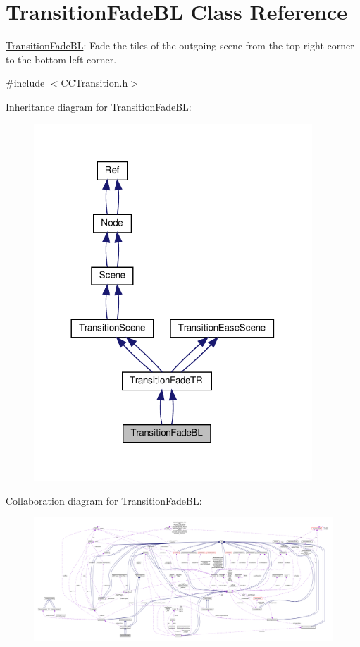 \hypertarget{classTransitionFadeBL}{}\section{Transition\+Fade\+BL Class Reference}
\label{classTransitionFadeBL}


\hyperlink{classTransitionFadeBL}{Transition\+Fade\+BL}\+: Fade the tiles of the outgoing scene from the top-\/right corner to the bottom-\/left corner.  




{\ttfamily \#include $<$C\+C\+Transition.\+h$>$}



Inheritance diagram for Transition\+Fade\+BL\+:
\nopagebreak
\begin{figure}[H]
\begin{center}
\leavevmode
\includegraphics[width=296pt]{classTransitionFadeBL__inherit__graph}
\end{center}
\end{figure}


Collaboration diagram for Transition\+Fade\+BL\+:
\nopagebreak
\begin{figure}[H]
\begin{center}
\leavevmode
\includegraphics[width=350pt]{classTransitionFadeBL__coll__graph}
\end{center}
\end{figure}
